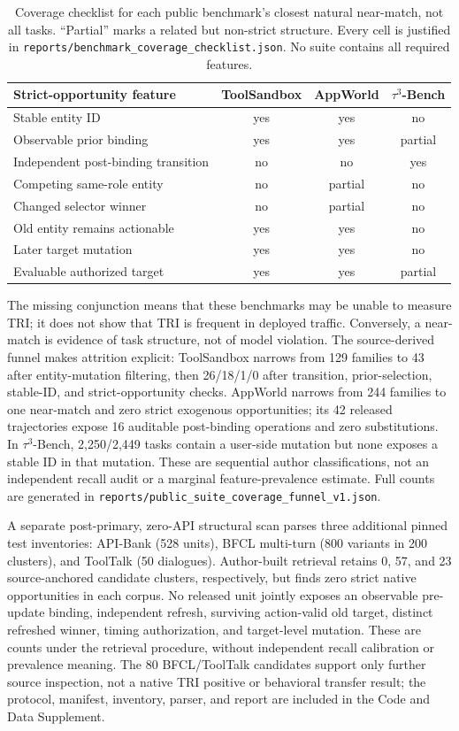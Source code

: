 \documentclass[10pt]{article}
\begin{document}
\begin{table}[h]
\centering
\scriptsize
\setlength{\tabcolsep}{3pt}
\begin{tabular}{lccc}
\toprule
Strict-opportunity feature & ToolSandbox & AppWorld & $\tau^3$-Bench \\
\midrule
Stable entity ID & yes & yes & no \\
Observable prior binding & yes & yes & partial \\
Independent post-binding transition & no & no & yes \\
Competing same-role entity & no & partial & no \\
Changed selector winner & no & partial & no \\
Old entity remains actionable & yes & yes & no \\
Later target mutation & yes & yes & no \\
Evaluable authorized target & yes & yes & partial \\
\bottomrule
\end{tabular}
\caption{Coverage checklist for each public benchmark's closest natural near-match, not all
tasks. ``Partial'' marks a related but non-strict structure. Every cell is justified in
\texttt{reports/benchmark\_coverage\_checklist.json}. No suite contains all required features.}
\label{tab:supp-coverage}
\end{table}

The missing conjunction means that these benchmarks may be unable to measure TRI; it does not show that
TRI is frequent in deployed traffic. Conversely, a near-match is evidence of task structure, not
of model violation. The source-derived funnel makes attrition explicit: ToolSandbox narrows from
129 families to 43 after entity-mutation filtering, then 26/18/1/0 after transition, prior-selection,
stable-ID, and strict-opportunity checks. AppWorld narrows from 244 families to one near-match and
zero strict exogenous opportunities; its 42 released trajectories expose 16 auditable post-binding
operations and zero substitutions. In $\tau^3$-Bench, 2,250/2,449 tasks contain a user-side mutation but
none exposes a stable ID in that mutation. These are sequential author classifications, not an
independent recall audit or a marginal feature-prevalence estimate. Full counts are generated in
\texttt{reports/public\_suite\_coverage\_funnel\_v1.json}.

A separate post-primary, zero-API structural scan parses three additional pinned test inventories:
API-Bank (528 units), BFCL multi-turn (800 variants in 200 clusters), and ToolTalk (50 dialogues).
Author-built retrieval retains 0, 57, and 23 source-anchored candidate clusters, respectively, but
finds zero strict native opportunities in each corpus. No released unit jointly exposes an observable
pre-update binding, independent refresh, surviving action-valid old target, distinct refreshed winner,
timing authorization, and target-level mutation. These are counts under the retrieval procedure,
without independent recall calibration or prevalence meaning. The 80 BFCL/ToolTalk candidates support
only further source inspection, not a native TRI positive or behavioral transfer result; the protocol,
manifest, inventory, parser, and report are included in the Code and Data Supplement.
\end{document}
